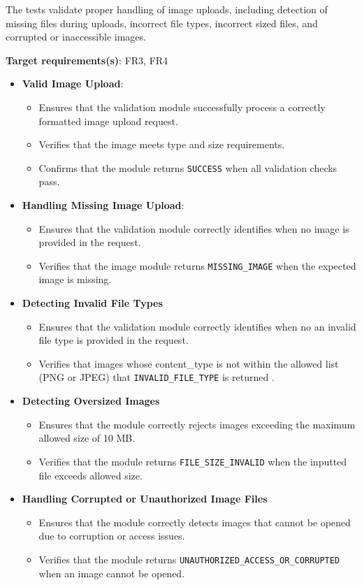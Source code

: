 \documentclass[12pt, titlepage]{article}
\begin{document}
The tests validate proper handling of image uploads, including detection of missing files during uploads, incorrect file types, 
incorrect sized files, and corrupted or inaccessible images. 

\textbf{Target requirements(s)}: FR3, FR4

\begin{itemize}

  \item \textbf{Valid Image Upload}:
  \begin{itemize}
    \item Ensures that the validation module successfully process a correctly formatted image upload request. 
    \item Verifies that the image meets type and size requirements.
    \item Confirms that the module returns \texttt{SUCCESS} when all validation checks pass.
  \end{itemize}

  \item \textbf{Handling Missing Image Upload}:
  \begin{itemize}
    \item Ensures that the validation module correctly identifies when no image is provided in the request. 
    \item Verifies that the image module returns \texttt{MISSING\_IMAGE} when the expected image is missing. 
  \end{itemize}

  \item \textbf{Detecting Invalid File Types}
  \begin{itemize}
    \item  Ensures that the validation module correctly identifies when no an invalid file type is provided in the request. 
    \item Verifies that images whose content\_type is not within the allowed list (PNG or JPEG) that \texttt{INVALID\_FILE\_TYPE} is returned .
  \end{itemize}

  \item \textbf{Detecting Oversized Images}
  \begin{itemize}
    \item Ensures that the module correctly rejects images exceeding the maximum allowed size of 10 MB.
    \item Verifies that the module returns \texttt{FILE\_SIZE\_INVALID} when the inputted file exceeds allowed size.
  \end{itemize}

  \item \textbf{Handling Corrupted or Unauthorized Image Files}
  \begin{itemize}
    \item Ensures that the module correctly detects images that cannot be opened due to corruption or access issues.
    \item Verifies that the module returns  \texttt{UNAUTHORIZED\_ACCESS\_OR\_CORRUPTED} when an image cannot be opened.
  \end{itemize}
\end{itemize}
\end{document}
